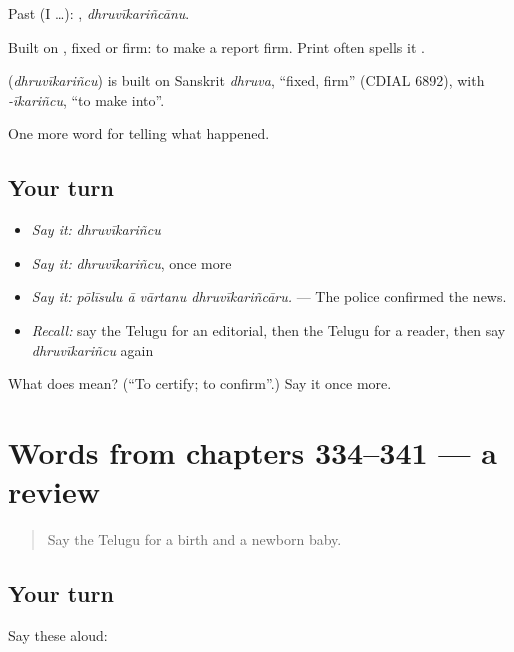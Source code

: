 Past (I …): , \emph{dhruvīkariñcānu}.

Built on , fixed or firm: to make a report firm. Print often spells it .

\begin{cousinweb}
\textbf{} (\emph{dhruvīkariñcu}) is built on Sanskrit \emph{dhruva}, \textquotedblleft{}fixed, firm\textquotedblright{} (CDIAL 6892), with \emph{-īkariñcu}, \textquotedblleft{}to make into\textquotedblright{}.
\end{cousinweb}

\begin{grammarlens}[title={What you've built}]
One more word for telling what happened.
\end{grammarlens}

\subsection*{Your turn}
\begin{itemize}
\raggedright
  \item \emph{Say it:} \emph{dhruvīkariñcu}
  \item \emph{Say it:} \emph{dhruvīkariñcu}, once more
  \item \emph{Say it:} \emph{pōlīsulu ā vārtanu dhruvīkariñcāru.} — The police confirmed the news.
  \item \emph{Recall:} say the Telugu for an editorial, then the Telugu for a reader, then say \emph{dhruvīkariñcu} again
\end{itemize}

\begin{tcolorbox}[breakable,colback=teal!4,colframe=teal!35!black,title={Before you move on}]
What does  mean? (\textquotedblleft{}To certify; to confirm\textquotedblright{}.) Say it once more.
\end{tcolorbox}
\section[(dialogue)]{Words from chapters 334–341 — a review}

\label{lesson:TE-R341-review-334-341}



\begin{quote}
Say the Telugu for a birth and a newborn baby.
\end{quote}

\subsection*{Your turn}
Say these aloud:

